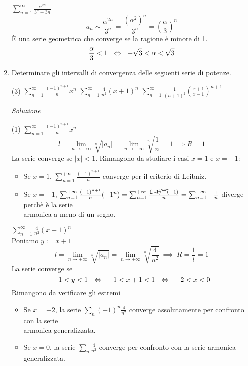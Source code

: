 \documentclass{article}
\begin{document}
\begin{enumerate}[label=\textbf{Esercizio 9.\arabic*.},itemindent=*]
\begin{tasks}
        \task $\sum_{n=1}^\infty\frac{\alpha^{2n}}{3^n+3n}$\\
        \[a_n\sim\frac{\alpha^{2n}}{3^n}=\frac{(\alpha^2)^n}{3^n}=\left( \frac{\alpha}{3} \right)^n\]
        È una serie geometrica che converge se la ragione è minore di 1. 
        \[\frac{\alpha}{3}<1 ~~\Leftrightarrow~~-\sqrt{3}<\alpha<\sqrt{3} \]
    \end{tasks}
    \item Determinare gli intervalli di convergenza delle seguenti serie di potenze.
    \begin{tasks}(3)
        \task $\sum_{n=1}^\infty\frac{(-1)^{n+1}}{n}x^n$
        \task $\sum_{n=1}^\infty\frac{4}{n^2}(x+1)^n$
        \task $\sum_{n=1}^\infty\frac{1}{(n+1)^2}\left( \frac{x+1}{x-1} \right)^{n+1}$
    \end{tasks}
    \item[\textit{\large Soluzione~}]~
    \begin{tasks}(1)
        \task $\sum_{n=1}^\infty\frac{(-1)^{n+1}}{n}x^n$
        \[l=\lim_{n\to+\infty}\sqrt[n]{|a_n|}=\lim_{n\to+\infty}\sqrt[n]{\frac{1}{n}}=1\implies R=1\]
        La serie converge se $|x|<1$. Rimangono da studiare i casi $x=1$ e $x=-1$:
        \begin{itemize}
            \item Se $x=1$, $\sum_{n=1}^{+\infty}\frac{(-1)^{n+1}}{n}$ converge per il criterio di Leibniz.
            \item Se $x=-1$, $\sum_{n=1}^{+\infty}\frac{(-1)^{n+1}}{n}(-1^n)=\sum_{n=1}^{+\infty}\frac{\cancel{(-1)^{2n}}(-1)}{n}=\sum_{n=1}^{+\infty}-\frac{1}{n}$ diverge perchè è la serie\\ armonica a meno di un segno.
        \end{itemize}
        \task $\sum_{n=1}^\infty\frac{4}{n^2}(x+1)^n$
        \\Poniamo $y:=x+1$
        \[l=\lim_{n\to+\infty}\sqrt[n]{|a_n|}=\lim_{n\to+\infty}\sqrt[n]{\frac{4}{n^2}}~\implies~R=\frac{1}{l}=1\]
        La serie converge se \[-1<y<1~~\Leftrightarrow~~-1<x+1<1~~\Leftrightarrow~~-2<x<0\]
        Rimangono da verificare gli estremi
        \begin{itemize}
            \item Se $x=-2$, la serie $\sum_n(-1)^n\frac{4}{n^2}$ converge assolutamente per confronto con la serie\\ armonica generalizzata.
            \item Se $x=0$, la serie $\sum_n\frac{4}{n^2}$ converge per confronto con la serie armonica generalizzata.
        \end{itemize}

\end{tasks}
\end{enumerate}
\end{document}
